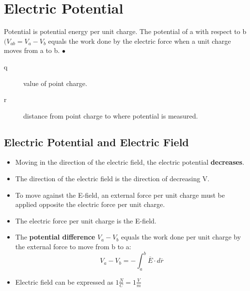 \section{Electric Potential}%
\label{sec:electric_potential}

\begin{definition}
	Potential is potential energy per unit charge. The potential of a with respect to b $(V_{ab} = V_{a} - V_{b} $
	 equals the work done by the electric force when a unit charge moves from a to b.
\smallskip\hfill$\bullet$\end{definition}


\begin{description}
	\item[q] value of point charge.
		\item[r] distance from point charge to where potential is measured.
\end{description}


\subsection{Electric Potential and Electric Field}%
\label{sub:electric_potential_and_electric_field}

\begin{itemize}
	\item Moving in the direction of the electric field, the electric potential \textbf{decreases}.
	\item The direction of the electric field is the direction of decreasing V.
	\item To move against the E-field, an external force per unit charge must be applied opposite the
		electric force per unit charge.
	\item The electric force per unit charge is the E-field.
		\item The \textbf{potential difference} $V_{a}-V_{b}$ equals the work done per unit
			charge by the external force to move from b to a:
			\[V_{a} - V_{b} = -\int_{a}^{b} \overline{E} \cdot d\overline{r} \]
		\item Electric field can be expressed as  $1 \frac{N}{C} = 1 \frac{V}{m}$
\end{itemize}

